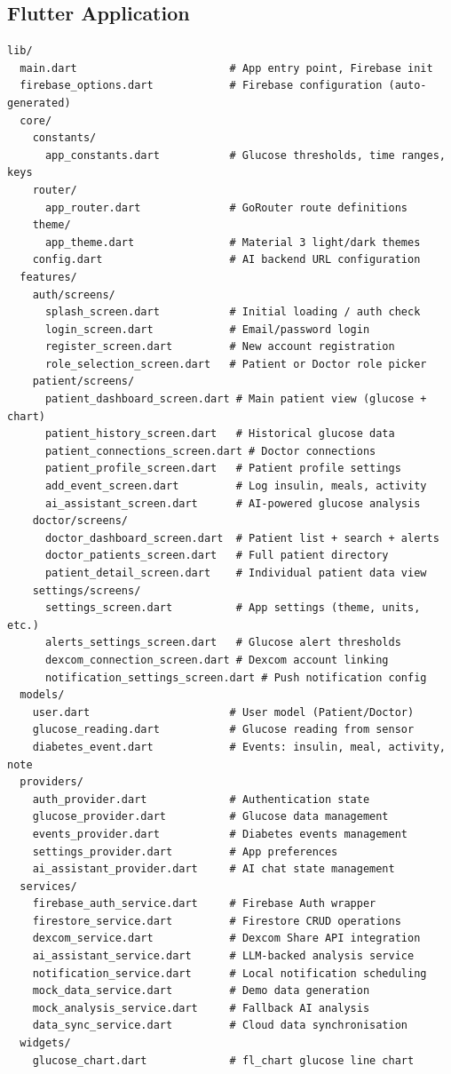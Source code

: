 \documentclass[12pt,a4paper]{article}
\begin{document}
\subsection{Flutter Application}

\begin{lstlisting}[style=yamlstyle, title={lib/ directory structure}]
lib/
  main.dart                        # App entry point, Firebase init
  firebase_options.dart            # Firebase configuration (auto-generated)
  core/
    constants/
      app_constants.dart           # Glucose thresholds, time ranges, keys
    router/
      app_router.dart              # GoRouter route definitions
    theme/
      app_theme.dart               # Material 3 light/dark themes
    config.dart                    # AI backend URL configuration
  features/
    auth/screens/
      splash_screen.dart           # Initial loading / auth check
      login_screen.dart            # Email/password login
      register_screen.dart         # New account registration
      role_selection_screen.dart   # Patient or Doctor role picker
    patient/screens/
      patient_dashboard_screen.dart # Main patient view (glucose + chart)
      patient_history_screen.dart   # Historical glucose data
      patient_connections_screen.dart # Doctor connections
      patient_profile_screen.dart   # Patient profile settings
      add_event_screen.dart         # Log insulin, meals, activity
      ai_assistant_screen.dart      # AI-powered glucose analysis
    doctor/screens/
      doctor_dashboard_screen.dart  # Patient list + search + alerts
      doctor_patients_screen.dart   # Full patient directory
      patient_detail_screen.dart    # Individual patient data view
    settings/screens/
      settings_screen.dart          # App settings (theme, units, etc.)
      alerts_settings_screen.dart   # Glucose alert thresholds
      dexcom_connection_screen.dart # Dexcom account linking
      notification_settings_screen.dart # Push notification config
  models/
    user.dart                      # User model (Patient/Doctor)
    glucose_reading.dart           # Glucose reading from sensor
    diabetes_event.dart            # Events: insulin, meal, activity, note
  providers/
    auth_provider.dart             # Authentication state
    glucose_provider.dart          # Glucose data management
    events_provider.dart           # Diabetes events management
    settings_provider.dart         # App preferences
    ai_assistant_provider.dart     # AI chat state management
  services/
    firebase_auth_service.dart     # Firebase Auth wrapper
    firestore_service.dart         # Firestore CRUD operations
    dexcom_service.dart            # Dexcom Share API integration
    ai_assistant_service.dart      # LLM-backed analysis service
    notification_service.dart      # Local notification scheduling
    mock_data_service.dart         # Demo data generation
    mock_analysis_service.dart     # Fallback AI analysis
    data_sync_service.dart         # Cloud data synchronisation
  widgets/
    glucose_chart.dart             # fl_chart glucose line chart
\end{lstlisting}
\end{document}
